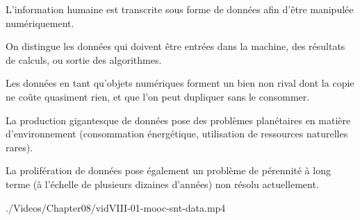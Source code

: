 \begin{jazzitemize}
\item L'information humaine est transcrite sous forme de données afin d'ê\-tre manipulée numériquement.
\item On distingue les données qui doivent être entrées dans la machine, des résultats de calculs, ou sortie des algorithmes. 
\item Les données en tant qu'objets numériques forment un bien non rival  dont la copie ne coûte quasiment rien, et que l'on peut dupliquer sans le consommer.
\item La production gigantesque de données pose des problèmes planétaires en matière d'environnement (consommation énergéti\-que, utilisation de ressources naturelles rares).
\item La prolifération de données pose également un problème de pérennité à long terme (à l'échelle de plusieurs dizaines d'années) non résolu actuellement.
\end{jazzitemize}
\parnotes



\begin{marginvideo}
		{./Videos/Chapter08/vidVIII-01-mooc-snt-data.mp4}%
\end{marginvideo}

